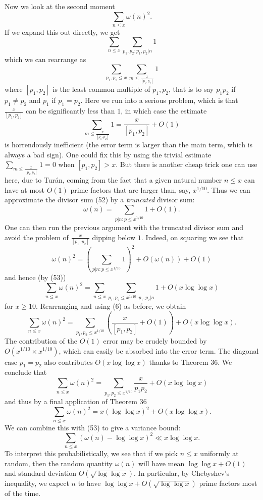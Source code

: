 \documentclass[10pt,reqno]{amsart}
\begin{document}
Now we look at the second moment
%
\[  \sum_{n \leq x} \omega(n)^2.\]
%
If we expand this out directly, we get
%
\[  \sum_{n \leq x} \sum_{p_1,p_2: p_1,p_2|n} 1\]
%
which we can rearrange as
%
\[  \sum_{p_1,p_2 \leq x} \sum_{m \leq \frac{x}{[p_1,p_2]}} 1\]
%
where $[p_1,p_2]$ is the least common multiple of $p_1,p_2$, that is to say $p_1p_2$ if $p_1 \neq p_2$ and $p_1$ if $p_1 = p_2$. Here we run into a serious problem, which is that $\frac{x}{[p_1,p_2]}$ can be significantly less than $1$, in which case the estimate
%
\[  \sum_{m \leq \frac{x}{[p_1,p_2]}} 1 = \frac{x}{[p_1,p_2]} + O(1)\]
%
is horrendously inefficient (the error term is larger than the main term, which is always a bad sign). One could fix this by using the trivial estimate $\sum_{m \leq \frac{x}{[p_1,p_2]}} 1 = 0$ when $[p_1,p_2] > x$. But there is another cheap trick one can use here, due to Turán, coming from the fact that a given natural number $n \leq x$ can have at most $O(1)$ prime factors that are larger than, say, $x^{1/10}$. Thus we can approximate the divisor sum (52) by a \emph{truncated} divisor sum:
%
\[  \omega(n) = \sum_{p|n: p \leq x^{1/10}} 1 + O(1).\]
%
One can then run the previous argument with the truncated divisor sum and avoid the problem of $\frac{x}{[p_1,p_2]}$ dipping below $1$. Indeed, on squaring we see that
%
\[  \omega(n)^2 = \left( \sum_{p|n: p \leq x^{1/10}} 1 \right)^2 + O( \omega(n) ) + O(1)\]
%
and hence (by (53))
%
\[  \sum_{n \leq x} \omega(n)^2 = \sum_{n \leq x} \sum_{p_1,p_2 \leq x^{1/10}: p_1,p_2|n} 1 + O( x \log\log x )\]
%
for $x \geq 10$. Rearranging and using (6) as before, we obtain
%
\[  \sum_{n \leq x} \omega(n)^2 = \sum_{p_1,p_2 \leq x^{1/10}} \left(\frac{x}{[p_1,p_2]} + O(1) \right) + O( x \log\log x ).\]
%
The contribution of the $O(1)$ error may be crudely bounded by $O( x^{1/10} \times x^{1/10} )$, which can easily be absorbed into the error term. The diagonal case $p_1=p_2$ also contributes $O( x \log\log x)$ thanks to Theorem 36. We conclude that
%
\[  \sum_{n \leq x} \omega(n)^2 = \sum_{p_1,p_2 \leq x^{1/10}} \frac{x}{p_1 p_2} + O( x \log\log x )\]
%
and thus by a final application of Theorem 36
%
\[  \sum_{n \leq x} \omega(n)^2 = x (\log\log x)^2 + O( x \log\log x ).\]
%
We can combine this with (53) to give a variance bound:
%
\[  \sum_{n \leq x} (\omega(n) - \log \log x)^2 \ll x \log\log x.\]
%
To interpret this probabilistically, we see that if we pick $n \leq x$ uniformly at random, then the random quantity $\omega(n)$ will have mean $\log\log x + O(1)$ and standard deviation $O( \sqrt{\log\log x} )$. In particular, by Chebyshev’s inequality, we expect $n$ to have $\log \log x + O( \sqrt{\log\log x})$ prime factors most of the time.
\end{document}
